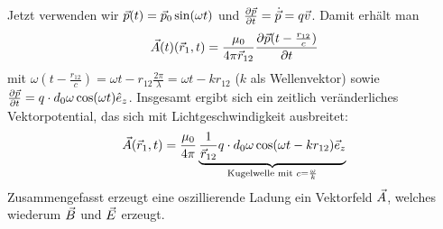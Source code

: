 Jetzt verwenden wir $\vecp(t) = \vecp_0 \sin(\omega t)$ und
$\dif[\vecp]{t} = \dot{\vecp} = q\vecv$.
Damit erhält man
\begin{gather*}
  \vecA(t)(\vecr_1, t) = \frac{\muo}{4\pi\vecr_{12}}
  \dif[\vecp(t-\frac{r_{12}}{c})]{t}
\end{gather*}
mit $\omega(t-\frac{r_{12}}{c}) = \omega t- r_{12}\frac{2\pi}{\lambda}
= \omega t - kr_{12}$ ($k$ als Wellenvektor) sowie
$\dif[\vecp]{t} = q\cdot d_0\omega\cos(\omega t) \hat e_z$.
Insgesamt ergibt sich ein zeitlich veränderliches Vektorpotential, das
sich mit Lichtgeschwindigkeit ausbreitet:
\begin{gather*}
  \vecA(\vecr_1,t) = \frac{\muo}{4\pi}
  \underbrace{
    \frac{1}{\vecr_{12}} q\cdot d_0\omega\cos(\omega t-kr_{12})
    \vece_z
  }_{\text{Kugelwelle mit }c=\frac{\omega}{k}}
\end{gather*}
Zusammengefasst erzeugt eine oszillierende Ladung ein Vektorfeld
$\vecA$, welches wiederum $\vecB$ und $\vecE$ erzeugt.

